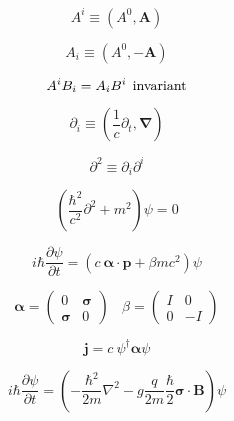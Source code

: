 \documentclass[11pt]{article}
\newcommand{\vect}[1]{\boldsymbol{\mathbf{#1}}}
\begin{document}
\begin{multicols}{2}
\begin{equation}
A^i \equiv (A^0, \vect{A})
\end{equation}

\begin{equation}
A_i \equiv (A^0, -\vect{A})
\end{equation}

\begin{equation}
A^i B_i = A_i B^i \:\: {\rm invariant}
\end{equation}

\begin{equation}
\partial_i \equiv (\frac{1}{c}\partial_t, \vect{\nabla})
\end{equation}

\begin{equation}
\partial^2 \equiv \partial_{i} \partial^{i}
\end{equation}

\begin{equation}
\left( \frac{\hbar^2}{c^2} \partial^2 + m^2 \right) \psi = 0
\end{equation}

\begin{equation}
i \hbar \frac{\partial \psi}{\partial t} =
 \left( c \: \vect{\alpha} \cdot \vect{p} + \beta mc^2 \right) \psi
\end{equation}

\begin{equation}
\vect{\alpha} = \left(
                   \begin{array}{cc}
                     0 & \vect{\sigma} \\
                     \vect{\sigma} & 0
                   \end{array}
                \right)
\:\:\:\:
\beta = \left(
           \begin{array}{cc}
              I & 0 \\
              0 & -I
           \end{array}
        \right)
\end{equation}

\begin{equation}
\vect{j} = c \: \psi^{\dagger} \vect{\alpha} \psi
\end{equation}

\begin{equation}
i \hbar \frac{\partial \psi}{\partial t} =
\left (-\frac{\hbar^2}{2m} \nabla^2
  - g \frac{q}{2m} \frac{\hbar}{2} \vect{\sigma}\cdot \vect{B} \right)
  \psi
\end{equation}


\end{multicols}
\end{document}
